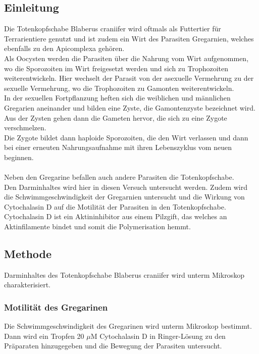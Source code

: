 \documentclass[oneside,10pt,a4paper]{report}
\begin{document}
			\subsection{Einleitung}
				Die Totenkopfschabe Blaberus craniifer wird oftmals als Futtertier für Terrarientiere genutzt und ist zudem ein Wirt des Parasiten Gregarnien, welches ebenfalls zu den Apicomplexa gehören.\\
				Als Oocysten werden die Parasiten über die Nahrung vom Wirt aufgenommen, wo die Sporozoiten im Wirt freigesetzt werden und sich zu Trophozoiten weiterentwickeln.
				Hier wechselt der Parasit von der asexuelle Vermehrung zu der sexuelle Vermehrung, wo die Trophozoiten zu Gamonten weiterentwickeln. \\
				In der sexuellen Fortpflanzung heften sich die weiblichen und männlichen Gregarien aneinander und bilden eine Zyste, die Gamontenzyste bezeichnet wird. Aus der Zysten gehen dann die Gameten hervor, die sich zu eine Zygote verschmelzen.\\
				Die Zygote bildet dann haploide Sporozoiten, die den Wirt verlassen und dann bei einer erneuten Nahrungsaufnahme mit ihren Lebenszyklus vom neuen beginnen\cite{Gregarinen}.\\
				\\
				Neben den Gregarine befallen auch andere Parasiten die Totenkopfschabe. \\
				Den Darminhaltes wird hier in diesen Versuch untersucht werden. Zudem wird die Schwimmgeschwindigkeit der Gregarnien untersucht und die Wirkung von Cytochalasin D auf die Motilität der Parasiten in den Totenkopfschabe.\\
				Cytochalasin D ist ein Aktininhibitor aus einem Pilzgift, das welches an Aktinfilamente bindet und somit die Polymerisation hemmt\cite{aktinhem}.
			\subsection{Methode}
				Darminhaltes des Totenkopfschabe Blaberus craniifer wird unterm Mikroskop charakterisiert.\\
				
				\subsubsection{Motilität des Gregarinen}
					Die Schwimmgeschwindigkeit des Gregarinen wird unterm Mikroskop bestimmt.\\
					Dann wird ein Tropfen 20 $\mu$M Cytochalasin D in Ringer-Lösung zu den Präparaten hinzugegeben und die Bewegung der Parasiten untersucht.\\
				
\end{document}
